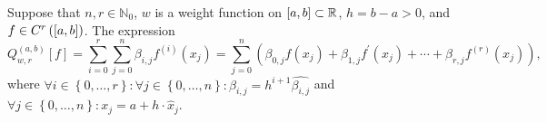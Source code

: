 \begin{frame}

    \begin{definition}
        Suppose that $n,r\in\mathbb{N}_{0}$,
        $w$ is a weight function on
        \begin{math}
            \left[a,b\right]\subset
            \mathbb{R}
        \end{math},
        $h=b-a>0$, and
        \begin{math}
            f\in
            C^{r}\left(
            \left[a,b\right]
            \right)
        \end{math}.
        The expression
        \begin{equation*}
            Q^{\left(a,b\right)}_{w,r}
            \left[f\right]=
            \sum_{i=0}^{r}
            \sum_{j=0}^{n}
            \beta_{i,j}
            f^{\left(i\right)}
            \left(x_{j}\right)=
            \sum_{j=0}^{n}
            \left(
            \beta_{0,j}
            f\left(x_{j}\right)+
            \beta_{1,j}
            f^{\prime}
            \left(x_{j}\right)+
            \cdots+
            \beta_{r,j}
            f^{\left(r\right)}
            \left(x_{j}\right)
            \right),
        \end{equation*}
        where
        \begin{math}
            \forall i\in
            \left\{0,\dotsc,r\right\}:
            \forall j\in
            \left\{0,\dotsc,n\right\}:
            \beta_{i,j}=
            h^{i+1}
            \widehat{\beta_{i,j}}
        \end{math}
        and
        \begin{math}
            \forall j\in
            \left\{0,\dotsc,n\right\}:
            x_{j}=
            a+
            h\cdot
            \widehat{x}_{j}
        \end{math}.
    \end{definition}
\end{frame}


